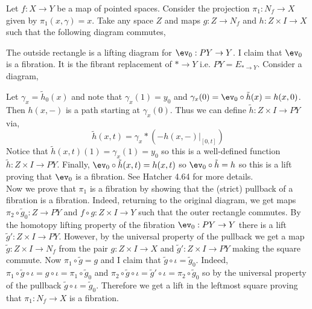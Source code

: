 \documentclass[12pt]{extarticle}
\begin{document}
Let $f : X \to Y$ be a map of pointed spaces. Consider the projection $\pi_1 : N_f \to X$ given by $\pi_1(x, \gamma) = x$. Take any space $Z$ and maps $g : Z \to N_f$ and $h : Z \times I \to X$ such that the following diagram commutes,
\begin{center}
\end{center}
The outside rectangle is a lifting diagram for $\ev_0 : PY \to Y$.
I claim that $\ev_0$ is a fibration. It is the fibrant replacement of $* \to Y$ i.e. $PY = E_{* \to Y}$. Consider a diagram,
\begin{center}
\end{center}
Let $\gamma_x = \tilde{h}_0(x)$ and note that $\gamma_x(1) = y_0$ and $\gamma_x(0) = \ev_0 \circ \tilde{h}(x) = h(x, 0)$. Then $h(x,-)$ is a path starting at $\gamma_x(0)$. Thus we can define $\tilde{h} : Z \times I \to PY$ via,
\[ \tilde{h}(x, t) = \gamma_x * (-h(x,-)|_{[0,t]}) \]
Notice that $\tilde{h}(x, t)(1) = \gamma_x(1) = y_0$ so this is a well-defined function $\tilde{h} : Z \times I \to PY$. Finally, $\ev_0 \circ \tilde{h}(x,t) = h(x,t)$ so $\ev_0 \circ \tilde{h} = h$ so this is a lift proving that $\ev_0$ is a fibration. See Hatcher 4.64 for more details. 
\bigskip\\
Now we prove that $\pi_1$ is a fibration by showing that the (strict) pullback of a fibration is a fibration. Indeed, returning to the original diagram, we get maps $\pi_2 \circ \tilde{g}_0 : Z \to PY$ and $f \circ g : Z \times I \to Y$ such that the outer rectangle commutes. By the homotopy lifting property of the fibration $\ev_0 : PY \to Y$ there is a lift $\tilde{g}' : Z \times I \to PY$. However, by the universal property of the pullback we get a map $\tilde{g} : Z \times I \to N_f$ from the pair $g : Z \times I \to X$ and $\tilde{g}' : Z \times I \to PY$ making the square commute. Now $\pi_1 \circ \tilde{g} = g$ and I claim that $\tilde{g} \circ \iota = \tilde{g}_0$. Indeed, $\pi_1 \circ \tilde{g} \circ \iota = g \circ \iota = \pi_1 \circ \tilde{g}_0$ and $\pi_2 \circ \tilde{g} \circ \iota = \tilde{g}' \circ \iota = \pi_2 \circ \tilde{g}_0$ so by the universal property of the pullback $\tilde{g} \circ \iota = \tilde{g}_0$. Therefore we get a lift in the leftmost square proving that $\pi_1 : N_f \to X$ is a fibration.
\end{document}
